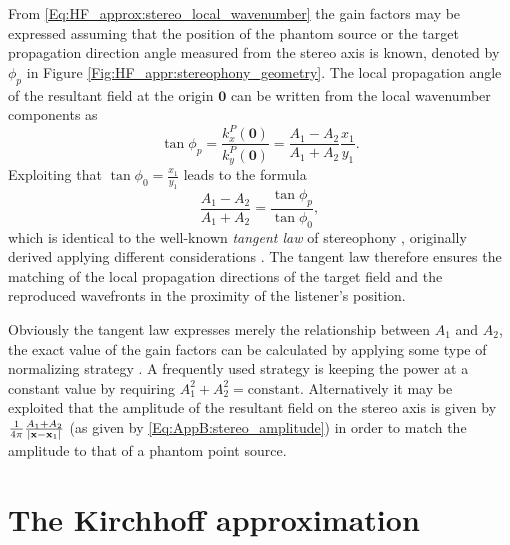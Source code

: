 From \eqref{Eq:HF_approx:stereo_local_wavenumber} the gain factors may be expressed assuming that the position of the phantom source or the target propagation direction angle measured from the stereo axis is known, denoted by $\phi_p$ in Figure \eqref{Fig:HF_appr:stereophony_geometry}.
The local propagation angle of the resultant field at the origin $\mathbf{0}$ can be written from the local wavenumber components as
\begin{equation}
\tan \phi_p = \frac{k_x^P(\mathbf{0})}{k_y^P(\mathbf{0})} = \frac{A_1-A_2}{A_1+A_2}\frac{x_1}{y_1}.
\end{equation}
Exploiting that $\tan \phi_0 = \frac{x_1}{y_1}$ leads to the formula
\begin{equation}
\frac{A_1 - A_2}{A_1 + A_2} = \frac{\tan \phi_p}{\tan \phi_0},
\end{equation}
which is identical to the well-known \emph{tangent law} of stereophony \cite{SpringerHandbookSpeech2008, Pulkki1997, Pulkki2001a, Pulkki2001:phd}, originally derived applying different considerations \cite{Bennett1985}.
The tangent law therefore ensures the matching of the local propagation directions of the target field and the reproduced wavefronts in the proximity of the listener's position.

Obviously the tangent law expresses merely the relationship between $A_1$ and $A_2$, the exact value of the gain factors can be calculated by applying some type of normalizing strategy \cite{Moore1990}.
A frequently used strategy is keeping the power at a constant value by requiring $A_1^2 + A_2^2 = \text{constant}$.
Alternatively it may be exploited that the amplitude of the resultant field on the stereo axis is given by $\frac{1}{4\pi}\frac{A_1+A_2}{|\mathbf{x}-\mathbf{x}_1|}$ (as given by \eqref{Eq:AppB:stereo_amplitude}) in order to match the amplitude to that of a phantom point source.

\section{The Kirchhoff approximation}

